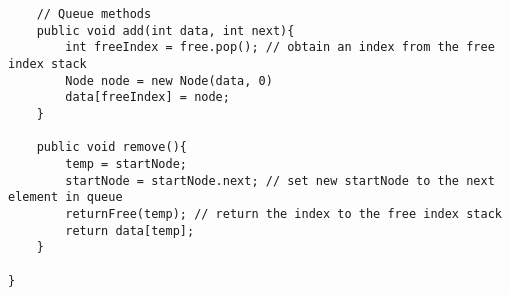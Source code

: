 \documentclass[11pt]{article}
\begin{document}
\begin{lstlisting}
    // Queue methods
    public void add(int data, int next){
        int freeIndex = free.pop(); // obtain an index from the free index stack
        Node node = new Node(data, 0)
        data[freeIndex] = node;
    }

    public void remove(){
        temp = startNode;
        startNode = startNode.next; // set new startNode to the next element in queue
        returnFree(temp); // return the index to the free index stack
        return data[temp];
    }
    
}
\end{lstlisting}
\end{document}
